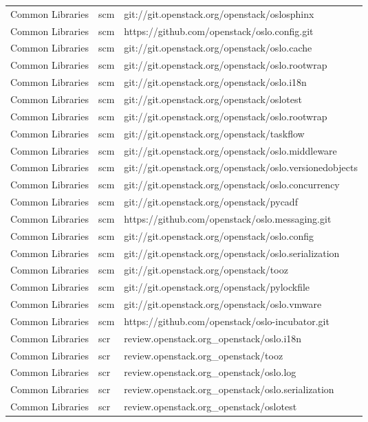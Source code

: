 \begin{center}
\begin{longtable}{|p{4cm}|p{1cm}|p{10cm}|}
Common Libraries&scm&git://git.openstack.org/openstack/oslosphinx\\ 
Common Libraries&scm&https://github.com/openstack/oslo.config.git\\ 
Common Libraries&scm&git://git.openstack.org/openstack/oslo.cache\\ 
Common Libraries&scm&git://git.openstack.org/openstack/oslo.rootwrap\\ 
Common Libraries&scm&git://git.openstack.org/openstack/oslo.i18n\\ 
Common Libraries&scm&git://git.openstack.org/openstack/oslotest\\ 
Common Libraries&scm&git://git.openstack.org/openstack/oslo.rootwrap\\ 
Common Libraries&scm&git://git.openstack.org/openstack/taskflow\\ 
Common Libraries&scm&git://git.openstack.org/openstack/oslo.middleware\\ 
Common Libraries&scm&git://git.openstack.org/openstack/oslo.versionedobjects\\ 
Common Libraries&scm&git://git.openstack.org/openstack/oslo.concurrency\\ 
Common Libraries&scm&git://git.openstack.org/openstack/pycadf\\ 
Common Libraries&scm&https://github.com/openstack/oslo.messaging.git\\ 
Common Libraries&scm&git://git.openstack.org/openstack/oslo.config\\ 
Common Libraries&scm&git://git.openstack.org/openstack/oslo.serialization\\ 
Common Libraries&scm&git://git.openstack.org/openstack/tooz\\ 
Common Libraries&scm&git://git.openstack.org/openstack/pylockfile\\ 
Common Libraries&scm&git://git.openstack.org/openstack/oslo.vmware\\ 
Common Libraries&scm&https://github.com/openstack/oslo-incubator.git\\ 
Common Libraries&scr&review.openstack.org\_openstack/oslo.i18n\\ 
Common Libraries&scr&review.openstack.org\_openstack/tooz\\ 
Common Libraries&scr&review.openstack.org\_openstack/oslo.log\\ 
Common Libraries&scr&review.openstack.org\_openstack/oslo.serialization\\ 
Common Libraries&scr&review.openstack.org\_openstack/oslotest\\ 

\end{longtable}
\end{center}
